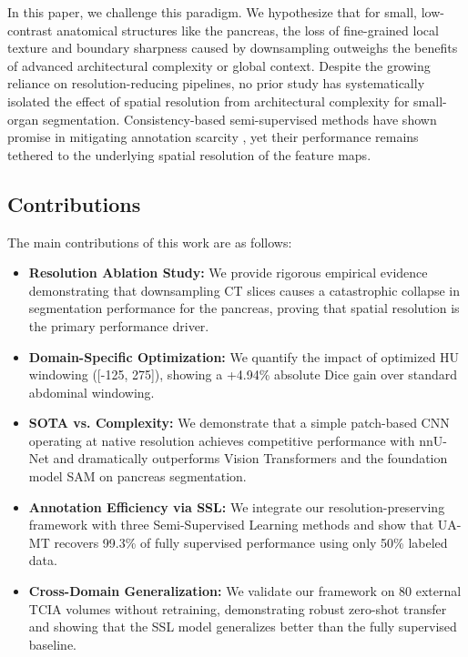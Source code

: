 \documentclass[journal, twocolumn]{IEEEtran}
\begin{document}
In this paper, we challenge this paradigm. We hypothesize that for small, low-contrast anatomical structures like the pancreas, the loss of fine-grained local texture and boundary sharpness caused by downsampling outweighs the benefits of advanced architectural complexity or global context. Despite the growing reliance on resolution-reducing pipelines, no prior study has systematically isolated the effect of spatial resolution from architectural complexity for small-organ segmentation. Consistency-based semi-supervised methods have shown promise in mitigating annotation scarcity \cite{con_med_ssl}, yet their performance remains tethered to the underlying spatial resolution of the feature maps.

\subsection{Contributions}
The main contributions of this work are as follows:
\begin{itemize}
    \item \textbf{Resolution Ablation Study:} We provide rigorous empirical evidence demonstrating that downsampling CT slices causes a catastrophic collapse in segmentation performance for the pancreas, proving that spatial resolution is the primary performance driver.
    \item \textbf{Domain-Specific Optimization:} We quantify the impact of optimized HU windowing ([-125, 275]), showing a +4.94\% absolute Dice gain over standard abdominal windowing.
    \item \textbf{SOTA vs. Complexity:} We demonstrate that a simple patch-based CNN operating at native resolution achieves competitive performance with nnU-Net and dramatically outperforms Vision Transformers and the foundation model SAM on pancreas segmentation.
    \item \textbf{Annotation Efficiency via SSL:} We integrate our resolution-preserving framework with three Semi-Supervised Learning methods and show that UA-MT recovers 99.3\% of fully supervised performance using only 50\% labeled data.
    \item \textbf{Cross-Domain Generalization:} We validate our framework on 80 external TCIA volumes without retraining, demonstrating robust zero-shot transfer and showing that the SSL model generalizes better than the fully supervised baseline.
\end{itemize}

\end{document}

